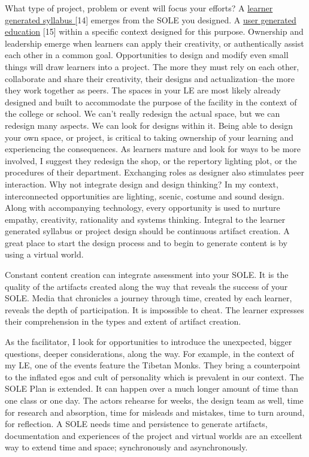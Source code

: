 What type of project, problem or event will focus your efforts? A
\href{http://www.theatreprof.com/2011/active-learning-student-generated-syllabus/}{learner
generated syllabus {[}}14{]} emerges from the SOLE you designed. A
\href{http://usergeneratededucation.wordpress.com/}{user generated
education} {[}15{]} within a specific context designed for this purpose.
Ownership and leadership emerge when learners can apply their
creativity, or authentically assist each other in a common goal.
Opportunities to design and modify even small things will draw learners
into a project. The more they must rely on each other, collaborate and
share their creativity, their designs and actualization--the more they
work together as peers. The spaces in your LE are most likely already
designed and built to accommodate the purpose of the facility in the
context of the college or school. We can't really redesign the actual
space, but we can redesign many aspects. We can look for designs within
it. Being able to design your own space, or project, is critical to
taking ownership of your learning and experiencing the consequences. As
learners mature and look for ways to be more involved, I suggest they
redesign the shop, or the repertory lighting plot, or the procedures of
their department. Exchanging roles as designer also stimulates peer
interaction. Why not integrate design and design thinking? In my
context, interconnected opportunities are lighting, scenic, costume and
sound design. Along with accompanying technology, every opportunity is
used to nurture empathy, creativity, rationality and systems thinking.
Integral to the learner generated syllabus or project design should be
continuous artifact creation. A great place to start the design process
and to begin to generate content is by using a virtual world.

Constant content creation can integrate assessment into your SOLE. It is
the quality of the artifacts created along the way that reveals the
success of your SOLE. Media that chronicles a journey through time,
created by each learner, reveals the depth of participation. It is
impossible to cheat. The learner expresses their comprehension in the
types and extent of artifact
creation.

As the facilitator, I look for opportunities to introduce the
unexpected, bigger questions, deeper considerations, along the way. For
example, in the context of my LE, one of the events feature the Tibetan
Monks. They bring a counterpoint to the inflated egos and cult of
personality which is prevalent in our context. The SOLE Plan is
extended. It can happen over a much longer amount of time than one class
or one day. The actors rehearse for weeks, the design team as well, time
for research and absorption, time for misleads and mistakes, time to
turn around, for reflection. A SOLE needs time and persistence to
generate artifacts, documentation and experiences of the project and
virtual worlds are an excellent way to extend time and space;
synchronously and asynchronously.

